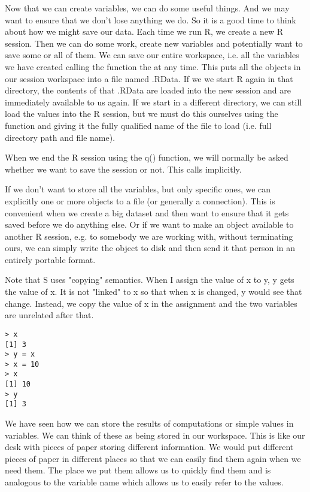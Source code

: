 {{{{ Now that we can create variables, we can do some useful things. And we may want to ensure that we don't lose anything we do. So it is a good time to think about how we might save our data. Each time we run R, we create a new R session. Then we can do some work, create new variables and potentially want to save some or all of them. We can save our entire workspace, i.e. all the variables we have created calling the function the  at any time. This puts all the objects in our session workspace into a file named .RData. If we we start R again in that directory, the contents of that .RData are loaded into the new session and are immediately available to us again. If we start in a different directory, we can still load the values into the R session, but we must do this ourselves using the function  and giving it the fully qualified name of the file to load (i.e. full directory path and file name). 

 When we end the R session using the q() function, we will normally be asked whether we want to save the session or not. This calls  implicitly. 

 If we don't want to store all the variables, but only specific ones, we can explicitly  one or more objects to a file (or generally a connection). This is convenient when we create a big dataset and then want to ensure that it gets saved before we do anything else. Or if we want to make an object available to another R session, e.g. to somebody we are working with, without terminating ours, we can simply write the object to disk and then send it that person in an entirely portable format. 

 Note that S uses "copying" semantics. When I assign the value of x to y, y gets the value of x. It is not "linked" to x so that when x is changed, y would see that change. Instead, we copy the value of x in the assignment and the two variables are unrelated after that. 
\begin{verbatim}
> x
[1] 3
> y = x
> x = 10
> x
[1] 10
> y
[1] 3
\end{verbatim}
 We have seen how we can store the results of computations or simple values in variables. We can think of these as being stored in our workspace. This is like our desk with pieces of paper storing different information. We would put different pieces of paper in different places so that we can easily find them again when we need them. The place we put them allows us to quickly find them and is analogous to the variable name which allows us to easily refer to the values. 

}}}}
